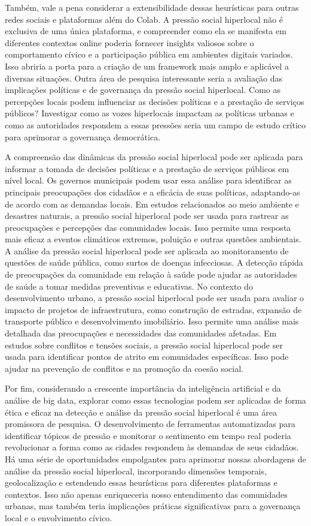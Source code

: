 Também, vale a pena considerar a extensibilidade dessas heurísticas para outras redes sociais e plataformas além do Colab. A pressão social hiperlocal não é exclusiva de uma única plataforma, e compreender como ela se manifesta em diferentes contextos online poderia fornecer insights valiosos sobre o comportamento cívico e a participação pública em ambientes digitais variados. Isso abriria a porta para a criação de um framework mais amplo e aplicável a diversas situações. Outra área de pesquisa interessante seria a avaliação das implicações políticas e de governança da pressão social hiperlocal. Como as percepções locais podem influenciar as decisões políticas e a prestação de serviços públicos? Investigar como as vozes hiperlocais impactam as políticas urbanas e como as autoridades respondem a essas pressões seria um campo de estudo crítico para aprimorar a governança democrática.

A compreensão das dinâmicas da pressão social hiperlocal pode ser aplicada para informar a tomada de decisões políticas e a prestação de serviços públicos em nível local. Os governos municipais podem usar essa análise para identificar as principais preocupações dos cidadãos e a eficácia de suas políticas, adaptando-as de acordo com as demandas locais. Em estudos relacionados ao meio ambiente e desastres naturais, a pressão social hiperlocal pode ser usada para rastrear as preocupações e percepções das comunidades locais. Isso permite uma resposta mais eficaz a eventos climáticos extremos, poluição e outras questões ambientais. A análise da pressão social hiperlocal pode ser aplicada ao monitoramento de questões de saúde pública, como surtos de doenças infecciosas. A detecção rápida de preocupações da comunidade em relação à saúde pode ajudar as autoridades de saúde a tomar medidas preventivas e educativas. No contexto do desenvolvimento urbano, a pressão social hiperlocal pode ser usada para avaliar o impacto de projetos de infraestrutura, como construção de estradas, expansão de transporte público e desenvolvimento imobiliário. Isso permite uma análise mais detalhada das preocupações e necessidades das comunidades afetadas. Em estudos sobre conflitos e tensões sociais, a pressão social hiperlocal pode ser usada para identificar pontos de atrito em comunidades específicas. Isso pode ajudar na prevenção de conflitos e na promoção da coesão social.

Por fim, considerando a crescente importância da inteligência artificial e da análise de big data, explorar como essas tecnologias podem ser aplicadas de forma ética e eficaz na detecção e análise da pressão social hiperlocal é uma área promissora de pesquisa. O desenvolvimento de ferramentas automatizadas para identificar tópicos de pressão e monitorar o sentimento em tempo real poderia revolucionar a forma como as cidades respondem às demandas de seus cidadãos. Há uma série de oportunidades empolgantes para aprimorar nossas abordagens de análise da pressão social hiperlocal, incorporando dimensões temporais, geolocalização e estendendo essas heurísticas para diferentes plataformas e contextos. Isso não apenas enriqueceria nosso entendimento das comunidades urbanas, mas também teria implicações práticas significativas para a governança local e o envolvimento cívico.

